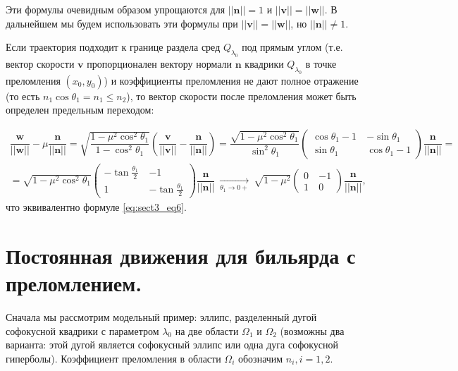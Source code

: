 \begin{statement}
    Эти формулы очевидным образом упрощаются для $||\mathbf{n}|| = 1$ и $||\mathbf{v}|| = ||\mathbf{w}||$. В дальнейшем мы будем использовать эти формулы при $||\mathbf{v}|| = ||\mathbf{w}||$, но $||\mathbf{n}|| \neq 1$.
\end{statement}

\begin{statement}
Если траектория подходит к границе раздела сред $Q_{\lambda_0}$ под прямым углом (т.е. вектор скорости $\mathbf{v}$ пропорционален вектору нормали $\mathbf{n}$   квадрики $Q_{\lambda_0}$ в точке преломления $(x_0,y_0)$) и коэффициенты преломления не дают полное отражение (то есть $n_1 \cos \theta_1 = n_1 \leq n_2$), то вектор скорости после преломления может быть определен предельным переходом:

\begin{multline*}
\dfrac{\mathbf{w}}{||\mathbf{w}||} - \mu \dfrac{\mathbf{n}}{||\mathbf{n}||}=  \sqrt{\dfrac{1-\mu^2 \cos^2 \theta_1 }{1-\cos^2\theta_1}} \left( \dfrac{\mathbf{v}}{||\mathbf{v}||} - \dfrac{\mathbf{n}}{||\mathbf{n}||} \right) 
=  \dfrac{\sqrt{1-\mu^2 \cos^2 \theta_1 }}{\sin^2\theta_1}  \left(
    \begin{array}{cc}
    \cos \theta_1 - 1 \ & -\sin \theta_1 \\
    \sin \theta_1 \ & \cos \theta_1 - 1 
    \end{array}
\right) \dfrac{\mathbf{n}}{||\mathbf{n}||} = \\
=  \sqrt{1-\mu^2 \cos^2 \theta_1 }  \left(
    \begin{array}{cc}
    -\tan \frac{\theta_1}{2}  \ & -1 \\
    1 \ & -\tan \frac{\theta_1}{2}
    \end{array}
\right) \dfrac{\mathbf{n}}{||\mathbf{n}||} \ \xrightarrow[\theta_1 \to 0+]{} \ 
\sqrt{1-\mu^2}  \left(
    \begin{array}{cc}
    0  \ & -1 \\
    1  \ & 0
    \end{array}
\right) \dfrac{\mathbf{n}}{||\mathbf{n}||},
\end{multline*}
что эквивалентно формуле \eqref{eq:sect3_eq6}.
\end{statement}
\medskip

\section{Постоянная движения для бильярда с преломлением.}
Сначала мы рассмотрим модельный пример: эллипс, разделенный дугой софокусной квадрики с параметром $\lambda_0$ на две области $\Omega_1$ и $\Omega_2$ (возможны два варианта: этой дугой является софокусный эллипс или одна дуга софокусной гиперболы). Коэффициент преломления в области  $\Omega_i$ обозначим $n_i, i=1,2$. 

